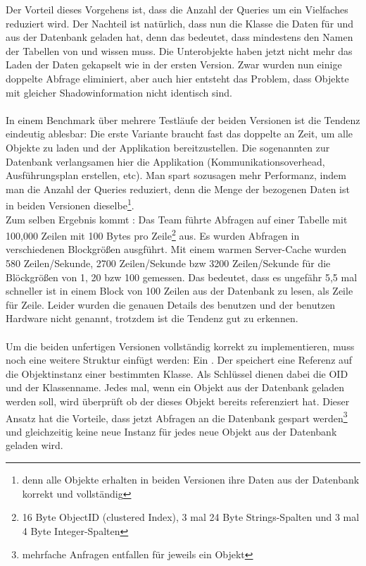 Der Vorteil dieses Vorgehens ist, dass die Anzahl der Queries um ein Vielfaches reduziert wird. Der Nachteil ist natürlich, dass nun die Klasse  die Daten für  und  aus der Datenbank geladen hat, denn das bedeutet, dass  mindestens den Namen der Tabellen von  und  wissen muss. Die Unterobjekte haben jetzt nicht mehr das Laden der Daten gekapselt wie in der ersten Version. Zwar wurden nun einige doppelte Abfrage eliminiert, aber auch hier entsteht das Problem, dass Objekte mit gleicher Shadowinformation nicht identisch sind. \\
\\
In einem Benchmark über mehrere Testläufe der beiden Versionen ist die Tendenz eindeutig ablesbar: Die erste Variante braucht fast das doppelte an Zeit, um alle Objekte zu laden und der Applikation bereitzustellen. Die sogenannten  zur Datenbank verlangsamen hier die Applikation (Kommunikationsoverhead, Aus\-füh\-rungs\-plan erstellen, etc). Man spart sozusagen mehr Performanz, indem man die Anzahl der Queries reduziert, denn die Menge der bezogenen Daten ist in beiden Versionen dieselbe\footnote{denn alle Objekte erhalten in beiden Versionen ihre Daten aus der Datenbank korrekt und vollständig}.\\
Zum selben Ergebnis kommt \cite{Bernstein99context-basedprefetch}: Das Team führte Abfragen auf einer Tabelle mit 100,000 Zeilen mit 100 Bytes pro Zeile\footnote{16 Byte ObjectID (clustered Index), 3 mal 24 Byte Strings-Spalten und 3 mal 4 Byte Integer-Spalten} aus. Es wurden Abfragen in verschiedenen Blockgrößen ausgführt. Mit einem warmen Server-Cache wurden 580 Zeilen/Sekunde, 2700 Zeilen/Sekunde bzw 3200 Zeilen/Sekunde für die Blöckgrößen von 1, 20 bzw 100 gemessen. Das bedeutet, dass es ungefähr 5,5 mal schneller ist in einem Block von 100 Zeilen aus der Datenbank zu lesen, als Zeile für Zeile. Leider wurden die genauen Details des benutzen \RDBMS und der benutzen Hardware nicht genannt, trotzdem ist die Tendenz gut zu erkennen.\\
\\
Um die beiden unfertigen Versionen vollständig korrekt zu implementieren, muss noch eine weitere Struktur einfügt werden: Ein \objectcache. Der \objectcache speichert eine Referenz auf die Objektinstanz einer bestimmten Klasse. Als Schlüssel dienen dabei die OID und der Klassenname. Jedes mal, wenn ein Objekt aus der Datenbank geladen werden soll, wird überprüft ob der \objectcache dieses Objekt bereits referenziert hat. Dieser Ansatz hat die Vorteile, dass jetzt Abfragen an die Datenbank gespart werden\footnote{mehrfache Anfragen entfallen für jeweils ein Objekt} und gleichzeitig keine neue Instanz für jedes neue Objekt aus der Datenbank geladen wird.\\
